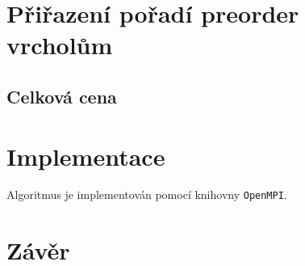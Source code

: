 \documentclass[12pt,a4paper]{article}
\begin{document}

\section{Přiřazení pořadí preorder vrcholům}
\label{sec:preorder}

\subsection*{Celková cena}
\label{sub:celkova_cena}

\section{Implementace}
\label{sec:implementace}
Algoritmus je implementován pomocí knihovny \texttt{OpenMPI}.

\section{Závěr}
\label{sec:závěr}
\end{document}
